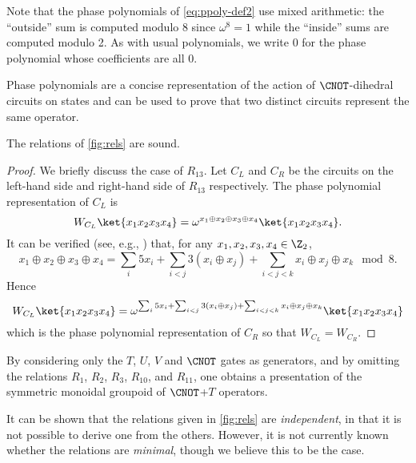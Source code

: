 \documentclass{eptcs}
\begin{document}
Note that the phase polynomials of \cref{eq:ppoly-def2} use mixed
arithmetic: the ``outside'' sum is computed modulo 8 since
$\omega^8=1$ while the ``inside'' sums are computed modulo 2. As with
usual polynomials, we write 0 for the phase polynomial whose
coefficients are all 0.

Phase polynomials are a concise representation of the action of
$\CNOT$-dihedral circuits on states and can be used to prove that two
distinct circuits represent the same operator.

\begin{proposition}
  \label{prop:soundness}
  The relations of \cref{fig:rels} are sound.
\end{proposition}

\begin{proof}
  We briefly discuss the case of $R_{13}$. Let $C_L$ and $C_R$ be the
  circuits on the left-hand side and right-hand side of $R_{13}$
  respectively. The phase polynomial representation of $C_L$ is
  \[
    W_{C_L}\ket{x_1x_2x_3x_4} = \omega^{x_1\oplus x_2\oplus x_3 \oplus
      x_4} \ket{x_1x_2x_3x_4}.
  \]
  It can be verified (see, e.g., \cite{AM}) that, for any
  $x_1, x_2, x_3, x_4 \in \Z_2$,
  \[
    x_1\oplus x_2\oplus x_3 \oplus x_4 = \sum_{i} 5x_i + \sum_{i<j}
    3(x_i\oplus x_j) + \sum_{i<j<k} x_i\oplus x_j\oplus x_k \mod 8.
  \]
  Hence
  \[
    W_{C_L}\ket{x_1x_2x_3x_4}=\omega^{\sum_{i} 5x_i + \sum_{i<j}
      3(x_i\oplus x_j) + \sum_{i<j<k} x_i\oplus x_j\oplus x_k}
    \ket{x_1x_2x_3x_4}
  \]
  which is the phase polynomial representation of $C_R$ so that
  $W_{C_L} = W_{C_R}$.
\end{proof}

\begin{remark}
  \label{rem:cnott-pres1}
  By considering only the $T$, $U$, $V$ and $\CNOT$ gates as
  generators, and by omitting the relations $R_1$, $R_2$, $R_3$,
  $R_{10}$, and $R_{11}$, one obtains a presentation of the symmetric
  monoidal groupoid of $\CNOT$+$T$ operators.
\end{remark}

\begin{remark}
  \label{rem:independence}
  It can be shown that the relations given in \cref{fig:rels} are
  \emph{independent}, in that it is not possible to derive one from
  the others. However, it is not currently known whether the relations
  are \emph{minimal}, though we believe this to be the case.
\end{remark}

\end{document}

